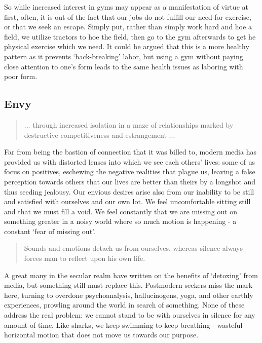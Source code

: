 \documentclass[letterpaper]{article}
\begin{document}
So while increased interest in gyms may appear as a manifestation of virtue at first, often, it is out of the fact that our jobs do not fulfill our need for exercise, or that we seek an escape. Simply put, rather than simply work hard and hoe a field, we utilize tractors to hoe the field, then go to the gym afterwards to get he physical exercise which we need. It could be argued that this is a more healthy pattern as it prevents `back-breaking' labor, but using a gym without paying close attention to one's form leads to the same health issues as laboring with poor form.

\subsection{Envy}

\begin{quote}
  ... through increased isolation in a maze of relationships marked by destructive competitiveness and estrangement ...
\end{quote}

Far from being the bastion of connection that it was billed to, modern media has provided us with distorted lenses into which we see each others' lives: some of us focus on positives, eschewing the negative realities that plague us, leaving a false perception towards others that our lives are better than theirs by a longshot and thus seeding jealousy. Our envious desires arise also from our inability to be still and satisfied with ourselves and our own lot. We feel uncomfortable sitting still and that we must fill a void. We feel constantly that we are missing out on something greater in a noisy world where so much motion is happening - a constant `fear of missing out'.

\begin{quote}
  Sounds and emotions detach us from ourselves, whereas silence always forces man to reflect upon his own life.
\end{quote}

A great many in the secular realm have written on the benefits of `detoxing' from media, but something still must replace this. Postmodern seekers miss the mark here, turning to overdone psychoanalysis, hallucinogens, yoga, and other earthly experiences, prowling around the world in search of something. None of these address the real problem: we cannot stand to be with ourselves in silence for any amount of time. Like sharks, we keep swimming to keep breathing - wasteful horizontal motion that does not move us towards our purpose.
\end{document}
